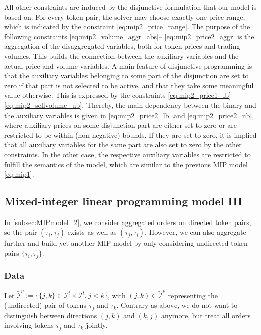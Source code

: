 \documentclass[11pt,parskip=full]{scrartcl}%
\newcommand*{\itokens}{\mathcal{I}^t}       %
\newcommand*{\iutokenpairs}{\tilde{\mathcal{I}}^p}   %
\begin{document}
All other constraints are induced by the disjunctive formulation that our model is based on.
For every token pair, the solver may choose exactly one price range, which is indicated by the
constraint \eqref{eq:mip2_price_range}.
The purpose of the following constraints \eqref{eq:mip2_volume_aggr_abs}--
\eqref{eq:mip2_price2_aggr} is the aggregation of the disaggregated variables, both for token
prices and trading volumes.
This builds the connection between the auxiliary variables and the actual price and volume
variables.
A main feature of disjunctive programming is that the auxiliary variables belonging to some part of
the disjunction are set to zero if that part is not selected to be active, and that they take
some meaningful value otherwise.
This is expressed by the constraints \eqref{eq:mip2_price1_lb}--\eqref{eq:mip2_sellvolume_ub}.
Thereby, the main dependency between the binary and the auxiliary variables is given in 
\eqref{eq:mip2_price2_lb} and \eqref{eq:mip2_price2_ub}, where auxiliary prices on some disjunction
part are either set to zero or are restricted to be within (non-negative) bounds.
If they are set to zero, it is implied that all auxiliary variables for the same part are also set
to zero by the other constraints.
In the other case, the respective auxiliary variables are restricted to fulfill the semantics of
the model, which are similar to the previous MIP model \eqref{eq:mip1}.



\subsection{Mixed-integer linear programming model III}
\label{subsec:MIPmodel_3}

In \ref{subsec:MIPmodel_2}, we consider aggregated orders on directed token pairs, so the pair $ 
(\tau_i,\tau_j) $ exists as well as $ (\tau_j,\tau_i) $.
However, we can also aggregate further and build yet another MIP model by only considering
undirected token pairs $ \{\tau_i,\tau_j\} $.

\subsubsection*{Data}

Let $ \iutokenpairs := \{\{j,k\} \in \itokens \times \itokens, j < k\} $, with $ (j,k) \in
\iutokenpairs $ representing the (undirected) pair of tokens $ \tau_j $ and $ \tau_k $.
Contrary as above, we do not want to distinguish between directions $ (j,k) $ and $ (k,j) $
anymore, but treat all orders involving tokens $ \tau_j $ and $ \tau_k $ jointly.
\end{document}
